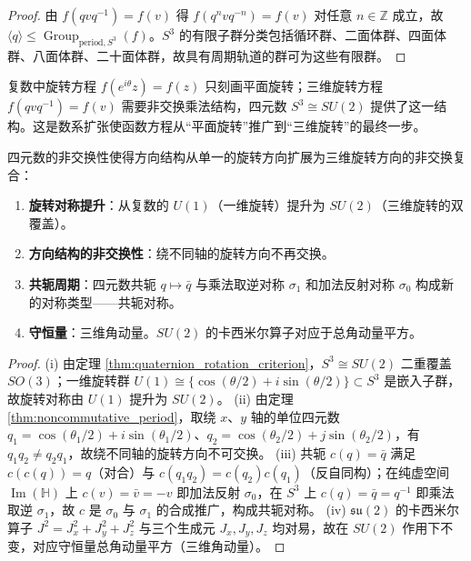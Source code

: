 \begin{proof}
由 $f(qvq^{-1})=f(v)$ 得 $f(q^n v q^{-n})=f(v)$ 对任意 $n\in\mathbb{Z}$ 成立，故 $\langle q\rangle\le\operatorname{Group}_{\mathrm{period},S^3}(f)$。$S^3$ 的有限子群分类包括循环群、二面体群、四面体群、八面体群、二十面体群，故具有周期轨道的群可为这些有限群。
\end{proof}

\begin{remark}\label{rem:quaternion_makes_rotation_algebraic}
复数中旋转方程 $f(e^{i\theta}z)=f(z)$ 只刻画平面旋转；三维旋转方程 $f(qvq^{-1})=f(v)$ 需要非交换乘法结构，四元数 $S^3\cong SU(2)$ 提供了这一结构。这是数系扩张使函数方程从“平面旋转”推广到“三维旋转”的最终一步。
\end{remark}

\begin{proposition}[四元数的方向性与周期性]\label{prop:quaternion_direction_period}
四元数的非交换性使得方向结构从单一的旋转方向扩展为三维旋转方向的非交换复合：
\begin{enumerate}[label=(\roman*)]
    \item \textbf{旋转对称提升}：从复数的 $U(1)$（一维旋转）提升为 $SU(2)$（三维旋转的双覆盖）。
    \item \textbf{方向结构的非交换性}：绕不同轴的旋转方向不再交换。
    \item \textbf{共轭周期}：四元数共轭 $q \mapsto \bar{q}$ 与乘法取逆对称 $\sigma_1$ 和加法反射对称 $\sigma_0$ 构成新的对称类型——共轭对称。
    \item \textbf{守恒量}：三维角动量。$SU(2)$ 的卡西米尔算子对应于总角动量平方。
\end{enumerate}
\end{proposition}

\begin{proof}
(i) 由定理 \ref{thm:quaternion_rotation_criterion}，$S^3 \cong SU(2)$ 二重覆盖 $SO(3)$；一维旋转群 $U(1) \cong \{\cos(\theta/2) + i\sin(\theta/2)\} \subset S^3$ 是嵌入子群，故旋转对称由 $U(1)$ 提升为 $SU(2)$。
(ii) 由定理 \ref{thm:noncommutative_period}，取绕 $x$、$y$ 轴的单位四元数 $q_1 = \cos(\theta_1/2)+i\sin(\theta_1/2)$、$q_2 = \cos(\theta_2/2)+j\sin(\theta_2/2)$，有 $q_1 q_2 \neq q_2 q_1$，故绕不同轴的旋转方向不可交换。
(iii) 共轭 $c(q) = \bar{q}$ 满足 $c(c(q)) = q$（对合）与 $c(q_1 q_2) = c(q_2)c(q_1)$（反自同构）；在纯虚空间 $\operatorname{Im}(\mathbb{H})$ 上 $c(v) = \bar{v} = -v$ 即加法反射 $\sigma_0$，在 $S^3$ 上 $c(q) = \bar{q} = q^{-1}$ 即乘法取逆 $\sigma_1$，故 $c$ 是 $\sigma_0$ 与 $\sigma_1$ 的合成推广，构成共轭对称。
(iv) $\mathfrak{su}(2)$ 的卡西米尔算子 $J^2 = J_x^2 + J_y^2 + J_z^2$ 与三个生成元 $J_x,J_y,J_z$ 均对易，故在 $SU(2)$ 作用下不变，对应守恒量总角动量平方（三维角动量）。
\end{proof}

